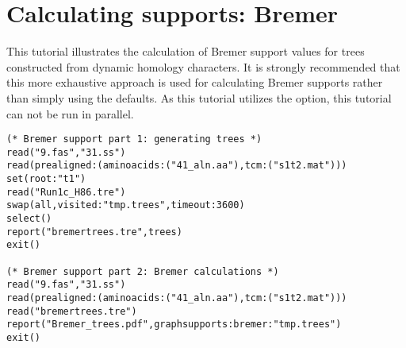


\section{Calculating supports: Bremer}{\label{tutorial4}}

This tutorial illustrates the calculation of Bremer support values for trees constructed from dynamic homology characters. 
It is strongly recommended that this more exhaustive approach is used for calculating Bremer supports rather than simply 
using the  defaults.  As this tutorial utilizes the  option, this 
tutorial can not be run in parallel.
    
\begin{verbatim}
(* Bremer support part 1: generating trees *)
read("9.fas","31.ss")
read(prealigned:(aminoacids:("41_aln.aa"),tcm:("s1t2.mat")))
set(root:"t1")
read("Run1c_H86.tre")
swap(all,visited:"tmp.trees",timeout:3600)
select()
report("bremertrees.tre",trees)
exit()

(* Bremer support part 2: Bremer calculations *)
read("9.fas","31.ss")
read(prealigned:(aminoacids:("41_aln.aa"),tcm:("s1t2.mat")))
read("bremertrees.tre")
report("Bremer_trees.pdf",graphsupports:bremer:"tmp.trees")
exit()
\end{verbatim}

